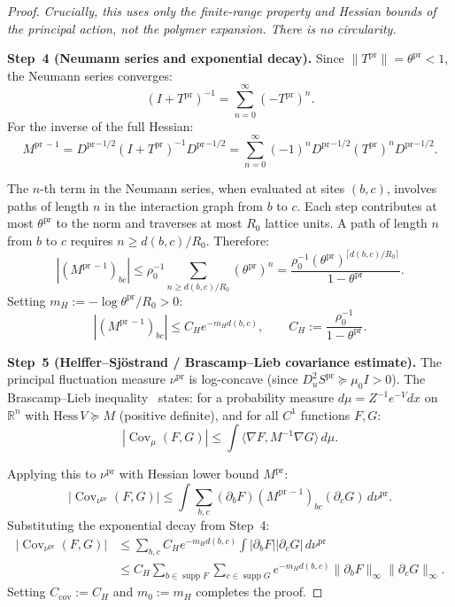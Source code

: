 \documentclass[12pt]{article}
\theoremstyle{plain}
\theoremstyle{definition}
\numberwithin{equation}{section}
\newcommand{\R}{\mathbb{R}}
\newcommand{\Cov}{\operatorname{Cov}}
\newcommand{\supp}{\operatorname{supp}}
\newcommand{\pr}{\mathrm{pr}}
\begin{document}
\begin{proof}
\emph{Crucially, this uses only the finite-range property and Hessian bounds of the principal action, not the polymer expansion.  There is no circularity.}

\textbf{Step~4 (Neumann series and exponential decay).}
Since $\|T^{\pr}\|=\theta^{\pr}<1$, the Neumann series converges:
\begin{equation}
(I+T^{\pr})^{-1} = \sum_{n=0}^\infty(-T^{\pr})^n.
\end{equation}
For the inverse of the full Hessian:
\begin{equation}
M^{\pr\,-1} = {D^{\pr}}^{-1/2}(I+T^{\pr})^{-1}{D^{\pr}}^{-1/2} = \sum_{n=0}^\infty(-1)^n{D^{\pr}}^{-1/2}(T^{\pr})^n{D^{\pr}}^{-1/2}.
\end{equation}

The $n$-th term in the Neumann series, when evaluated at sites $(b,c)$, involves paths of length $n$ in the interaction graph from $b$ to $c$.  Each step contributes at most $\theta^{\pr}$ to the norm and traverses at most $R_0$ lattice units.  A path of length $n$ from $b$ to $c$ requires $n\geq d(b,c)/R_0$.  Therefore:
\begin{equation}
|(M^{\pr\,-1})_{bc}| \leq \rho_0^{-1}\sum_{n\geq d(b,c)/R_0}(\theta^{\pr})^n = \frac{\rho_0^{-1}(\theta^{\pr})^{\lceil d(b,c)/R_0\rceil}}{1-\theta^{\pr}}.
\end{equation}
Setting $m_H:=-\log\theta^{\pr}/R_0>0$:
\begin{equation}
\boxed{|(M^{\pr\,-1})_{bc}| \leq C_H e^{-m_H d(b,c)},\qquad C_H:=\frac{\rho_0^{-1}}{1-\theta^{\pr}}.}
\end{equation}

\textbf{Step~5 (Helffer--Sj\"ostrand / Brascamp--Lieb covariance estimate).}
The principal fluctuation measure $\nu^{\pr}$ is log-concave (since $D_u^2 S^{\pr}\succeq\mu_0 I>0$).  The Brascamp--Lieb inequality~\cite{BrascampLieb} states: for a probability measure $d\mu=Z^{-1}e^{-V}dx$ on $\R^n$ with $\mathrm{Hess}\,V\succeq M$ (positive definite), and for all $C^1$ functions $F,G$:
\begin{equation}
|\Cov_\mu(F,G)| \leq \int\langle\nabla F,M^{-1}\nabla G\rangle\,d\mu.
\end{equation}

Applying this to $\nu^{\pr}$ with Hessian lower bound $M^{\pr}$:
\begin{equation}
|\Cov_{\nu^{\pr}}(F,G)| \leq \int\sum_{b,c}(\partial_b F)(M^{\pr\,-1})_{bc}(\partial_c G)\,d\nu^{\pr}.
\end{equation}
Substituting the exponential decay from Step~4:
\begin{align}
|\Cov_{\nu^{\pr}}(F,G)| &\leq \sum_{b,c}C_H e^{-m_H d(b,c)}\int|\partial_b F||\partial_c G|\,d\nu^{\pr}\\
&\leq C_H\sum_{b\in\supp F}\sum_{c\in\supp G}e^{-m_H d(b,c)}\|\partial_b F\|_\infty\|\partial_c G\|_\infty.
\end{align}
Setting $C_{\mathrm{cov}}:=C_H$ and $m_0:=m_H$ completes the proof.
\end{proof}
\end{document}
